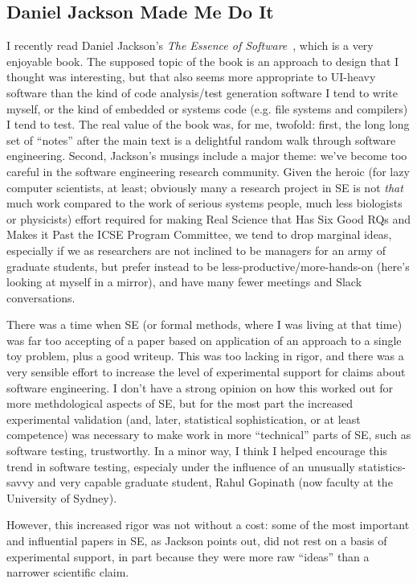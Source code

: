 \documentclass[sigplan,screen]{acmart}
\begin{document}
\subsection{Daniel Jackson Made Me Do It}

I recently read Daniel Jackson's \emph{The Essence of Software}~\cite{essence}, which
is a very enjoyable book.  The supposed topic of the book is an
approach to design that I thought was interesting, but that also seems
more appropriate to UI-heavy software than the
kind of code analysis/test generation software I tend to write
myself, or the kind of embedded or systems code (e.g. file systems and
compilers) I
tend to test.  The real value of the book was, for me, twofold:  first, the
long long set of ``notes'' after the main text is a delightful random
walk through software engineering.  Second, Jackson's musings include
a major theme:  we've become too careful in the software engineering
research community.  Given the heroic (for lazy computer scientists,
at least;
obviously many a research project in SE is not \emph{that} much work compared to
the work of serious systems people, much less biologists or
physicists) effort required for making Real Science that Has Six Good
RQs and Makes it Past the ICSE Program Committee, we tend to drop
marginal ideas, especially if we as researchers are not inclined to be
managers for an army of graduate students, but prefer instead to be
less-productive/more-hands-on (here's looking at myself in a mirror),
and have many fewer meetings and Slack conversations.

There was a time
when SE (or formal methods, where I was living at that time) was far
too accepting of a paper based on application of an approach to a
single toy problem, plus a good writeup.  This was too lacking in
rigor, and there was a very sensible effort to increase the level of
experimental support for claims about software engineering.  I don't
have a strong opinion on how this worked out for more methdological
aspects of SE, but for the most part the increased experimental
validation (and, later, statistical sophistication, or at least competence) was necessary to
make work in more ``technical'' parts of SE, such as software testing,
trustworthy.  In a minor way, I think I helped encourage this trend in
software testing, especialy under the influence of an unusually
statistics-savvy and very capable graduate student, Rahul Gopinath
(now faculty at the University of Sydney).

However, this increased rigor was not without a cost:  some of the most important and
influential papers in SE, as Jackson points out, did not rest on a
basis of experimental support, in part because they were more raw
``ideas'' than a narrower scientific claim.
\end{document}
